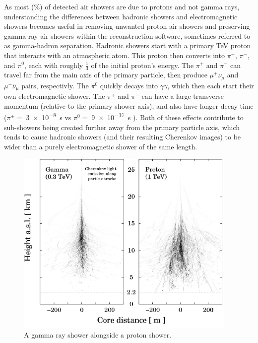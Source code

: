   As most (\%) of detected air showers are due to protons and not gamma rays, understanding the differences between hadronic showers and electromagnetic showers becomes useful in removing unwanted proton air showers and preserving gamma-ray air showers within the reconstruction software, sometimes referred to as gamma-hadron separation.
  Hadronic showers start with a primary \nicetilde TeV proton that interacts with an atmospheric atom.
  This proton then converts into $\pi^{+}$, $\pi^{-}$, and $\pi^{0}$, each with roughly \nicetilde $\frac{1}{3}$ of the initial proton's energy.
  The $\pi^{+}$ and $\pi^{-}$ can travel far from the main axis of the primary particle, then produce $\mu^{+}\nu_{\mu}$ and $\mu^{-}\bar{\nu}_{\mu}$ pairs, respectivly.
  The $\pi^{0}$ quickly decays into $\gamma\gamma$, which then each start their own electromagnetic shower.
  The $\pi^{+}$ and $\pi^{-}$ can have a large transverse momentum (relative to the primary shower axis), and also have longer decay time ($\pi^{\pm}=\;$\SI{3e-8}{s} vs $\pi^{0}=\;$\SI{9e-17}{s} \cite{pdg_2014} ).
  Both of these effects contribute to sub-showers being created further away from the primary particle axis, which tends to cause hadronic showers (and their resulting Cherenkov images) to be wider than a purely electromagnetic shower of the same length. 

  \begin{figure}[ht]
    \centering
    \includegraphics[width=0.95\textwidth]{images/showers_gamma_proton}
    \caption[Gamma Ray and Proton Showers]{
      A gamma ray shower alongside a proton shower.\cite{Bernlohr2008149}
    }
    \label{fig:gamma_vs_proton_airshower}
  \end{figure}


